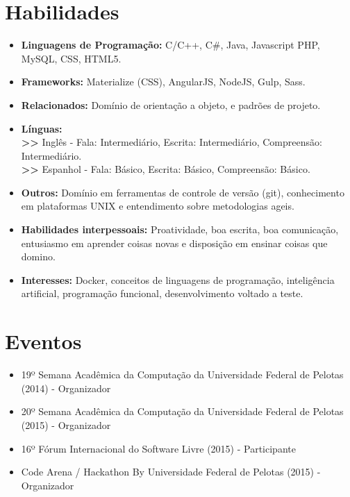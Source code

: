 \documentclass[11pt,a4paper,sans]{moderncv}        %
\begin{document}
\section{Habilidades}

\vspace{6pt}

\begin{itemize}

\item \textbf{Linguagens de Programação:} C/C++, C\#, Java, Javascript PHP, MySQL, CSS, HTML5.
\item \textbf{Frameworks:} Materialize (CSS), AngularJS, NodeJS, Gulp, Sass.
\item \textbf{Relacionados:} Domínio de orientação a objeto, e padrões de projeto. 
\item \textbf{Línguas:}
\\\textbf{>>} Inglês - Fala: Intermediário, Escrita: Intermediário, Compreensão: Intermediário. 
\\\textbf{>>} Espanhol - Fala: Básico, Escrita: Básico, Compreensão: Básico.  
\item \textbf{Outros:} Domínio em ferramentas de controle de versão (git), conhecimento em plataformas UNIX e entendimento sobre metodologias ageis.
\item \textbf{Habilidades interpessoais:} Proatividade, boa escrita, boa comunicação, entusiasmo em aprender coisas novas e disposição em ensinar coisas que domino.
\item \textbf{Interesses:} Docker, conceitos de linguagens de programação, inteligência artificial, programação funcional, desenvolvimento voltado a teste. 

\end{itemize}


\section{Eventos}

\vspace{6pt}
 
\begin{itemize}

\item{19º Semana Acadêmica da Computação da Universidade Federal de Pelotas (2014) - Organizador}
\item{20º Semana Acadêmica da Computação da Universidade Federal de Pelotas (2015)  - Organizador}
\item{16º Fórum Internacional do Software Livre (2015) - Participante}
\item{Code Arena / Hackathon By Universidade Federal de Pelotas (2015) - Organizador}
\end{itemize}
\end{document}
